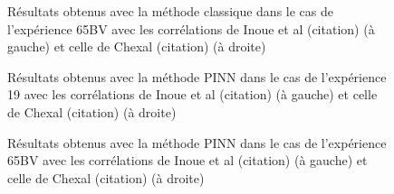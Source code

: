 \begin{figure}
    \centering
    \resizebox{0.47\linewidth}{!}{}
    \resizebox{0.47\linewidth}{!}{}
    \caption{Résultats obtenus avec la méthode classique dans le cas de l'expérience 65BV avec les corrélations de Inoue et al (citation) (à gauche) et celle de Chexal (citation) (à droite)}
    \label{fig:Result_classique_65BV}
\end{figure}

\begin{figure}
    \centering
    \resizebox{0.47\linewidth}{!}{}
    \resizebox{0.47\linewidth}{!}{}
    \caption{Résultats obtenus avec la méthode PINN dans le cas de l'expérience 19 avec les corrélations de Inoue et al (citation) (à gauche) et celle de Chexal (citation) (à droite)}
    \label{fig:Result_PINN_19}
\end{figure}

\begin{figure}
    \centering
    \resizebox{0.47\linewidth}{!}{}
    \resizebox{0.47\linewidth}{!}{}
    \caption{Résultats obtenus avec la méthode PINN dans le cas de l'expérience 65BV avec les corrélations de Inoue et al (citation) (à gauche) et celle de Chexal (citation) (à droite)}
    \label{fig:Result_PINN_65BV}
\end{figure}